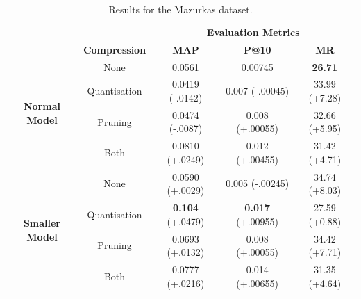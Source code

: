 \documentclass{article}
\begin{document}
{\begin{table}[h]
    \centering
    \begin{subtable}{\textwidth}
        \centering
        \begin{tabular}{|c|c|c|c|c|}
            \hline
            \rowcolor{lightgray} & & \multicolumn{3}{|c|}{\textbf{Evaluation Metrics}}  \\
            \cline{2-5}
            \rowcolor{lightgray}& \textbf{Compression} & \textbf{MAP} & \textbf{P@10} & \textbf{MR} \\
            \hline
            \multirow{4}{*}{\textbf{Normal Model}} & None & 0.0561 & 0.00745 & \textbf{26.71} \\
            \cline{2-5}
            & Quantisation & \cellcolor{red!20}0.0419 (-.0142) & \cellcolor{red!10}0.007 (-.00045) & \cellcolor{red!40}33.99 (+7.28) \\
            \cline{2-5}
            & Pruning & \cellcolor{red!10}0.0474 (-.0087) & \cellcolor{green!10}0.008 (+.00055) & \cellcolor{red!30}32.66 (+5.95) \\
            \cline{2-5}
            & Both & \cellcolor{green!30}0.0810 (+.0249) & \cellcolor{green!20}0.012 (+.00455) & \cellcolor{red!20}31.42 (+4.71) \\
            \hline
            \multirow{4}{*}{\textbf{Smaller Model}} & None & \cellcolor{green!10}0.0590 (+.0029) & \cellcolor{red!20}0.005 (-.00245) & \cellcolor{red!50}34.74 (+8.03) \\
            \cline{2-5}
            & Quantisation & \cellcolor{green!50}\textbf{0.104} (+.0479) & \cellcolor{green!50}\textbf{0.017} (+.00955) & \cellcolor{red!10}27.59 (+0.88) \\
            \cline{2-5}
            & Pruning & \cellcolor{green!20}0.0693 (+.0132) & \cellcolor{green!10}0.008 (+.00055) & \cellcolor{red!45}34.42 (+7.71) \\
            \cline{2-5}
            & Both & \cellcolor{green!30}0.0777 (+.0216) & \cellcolor{green!35}0.014 (+.00655) & \cellcolor{red!20}31.35 (+4.64) \\
            \hline
        \end{tabular}
        \caption{Results for the Mazurkas dataset.}
        \label{fig:mazurkasresults}
    \end{subtable}


\end{table}}
\end{document}
